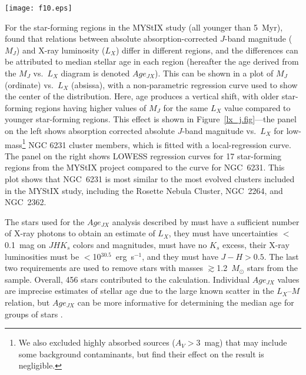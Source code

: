 \documentclass[twocolumn,tighten]{aastex61}
\begin{document}
\begin{figure*}[t]
\centering
\texttt{[image: f10.eps]} 
\caption{Left: X-ray luminosity is plotted against dereddened absolute $J$-band magnitude for NGC~6231 cluster members. The black line shows the local-regression (LOWESS) curve fit to the data. Right: Local-regression curves are shown for all MYStIX star-forming regions included in \citet{2014ApJ...787..108G} in comparison to NGC~6231. \citet{2014ApJ...787..108G} identified median age as being primarily responsible for the vertical stratification. (Stars with X-ray luminosities greater than $\log L_X>30.5$ are excluded by \citet{2014ApJ...787..108G} as many of these stars could be high-mass.)
 \label{lx_j.fig}}
\end{figure*}

For the star-forming regions in the MYStIX study (all younger than 5~Myr), \citet{2014ApJ...787..108G} found that relations between absolute absorption-corrected $J$-band magnitude ($M_J$) and X-ray luminosity ($L_X$) differ in different regions, and the differences can be attributed to median stellar age in each region (hereafter the age derived from the $M_J$ vs.\ $L_X$ diagram is denoted $Age_{JX}$). This can be shown in a plot of  $M_J$ (ordinate) vs.\ $L_X$ (absissa), with a non-parametric regression curve used to show the center of the distribution. Here, age produces a vertical shift, with older star-forming regions having higher values of $M_J$ for the same $L_X$ value compared to younger star-forming regions. This effect is shown in Figure~\ref{lx_j.fig}---the panel on the left shows absorption corrected absolute $J$-band magnitude vs.\ $L_X$ for low-mass\footnote{We also excluded highly absorbed sources ($A_V>3$~mag) that may include some background contaminants, but find their effect on the result is negligible.} NGC 6231 cluster members, which is fitted with a local-regression \citep[LOWESS;][]{cleveland1979robust,cleveland1981lowess} curve. The panel on the right shows LOWESS regression curves for 17 star-forming regions from the MYStIX project compared to the curve for NGC~6231.  This plot shows that NGC~6231 is most similar to the most evolved clusters included in the MYStIX study, including the Rosette Nebula Cluster, NGC~2264, and NGC~2362.

The stars used for the $Age_{JX}$ analysis described by \citet{2014ApJ...787..108G} must have a sufficient number of X-ray photons to obtain an estimate of $L_X$, they must have uncertainties $<$0.1~mag on $JHK_s$ colors and magnitudes, must have no $K_s$ excess, their X-ray luminosities must be $<$10$^{30.5}$~erg~s$^{-1}$, and they must have $J-H>0.5$. The last two requirements are used to remove stars with masses $\gtrsim$1.2~$M_\odot$ stars from the sample.  Overall, 456 stars contributed to the calculation. Individual $Age_{JX}$ values are imprecise estimates of stellar age due to the large known scatter in the $L_X$--$M$ relation, but $Age_{JX}$ can be more informative for determining the median age for groups of stars \citep{2014ApJ...787..109G,2014ApJ...787..108G}.
\end{document}
